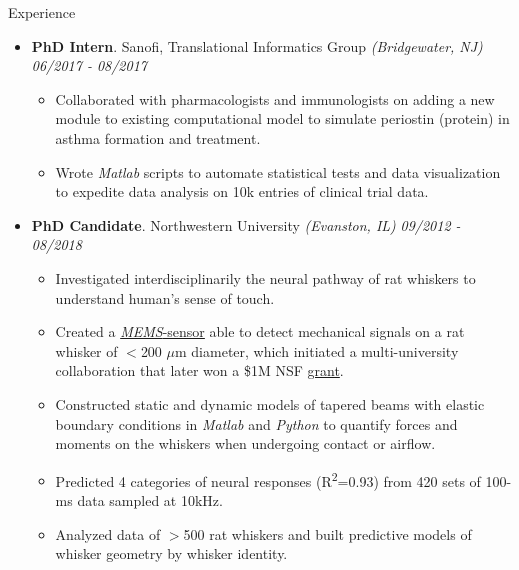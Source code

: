 \documentclass{resume} %
\begin{document}
\begin{rSection}{Experience}
\begin{itemize}[leftmargin=0em]
			\item {\bf PhD Intern}{. Sanofi, Translational Informatics Group \textit{(Bridgewater, NJ)}} \hfill {\em 06/2017 - 08/2017}\\
			\vspace{-5mm}
			\begin{itemize}
				\setlength\itemsep{-1.75em}	
				\item Collaborated with pharmacologists and immunologists on adding a new module to existing computational model to simulate periostin (protein) in asthma formation and treatment.\\
				\item Wrote \textit{Matlab} scripts to automate statistical tests and data visualization to expedite data analysis on 10k entries of clinical trial data.
			\end{itemize}
			
			\item {\bf PhD Candidate}{. Northwestern University \textit{(Evanston, IL)}} \hfill {\em 09/2012 - 08/2018}\\
			\vspace{-5mm}
			\begin{itemize}
				\setlength\itemsep{-1.75em}
				\item Investigated interdisciplinarily the neural pathway of rat whiskers to understand human's sense of touch.\\
				\item Created a \href{https://www.youtube.com/watch?v=EPuThXPd-qw}{\textit{MEMS}-sensor} able to detect mechanical signals on a rat whisker of $<$200 $\mu$m diameter, which initiated a multi-university collaboration that later won a \$1M NSF \href{https://www.nsf.gov/news/mmg/mmg_disp.jsp?med_id=132588}{grant}.\\
				\item Constructed static and dynamic models of tapered beams with elastic boundary conditions in \textit{Matlab} and \textit{Python} to quantify forces and moments on the whiskers when undergoing contact or airflow.\\
				\item Predicted 4 categories of neural responses (R\textsuperscript{2}=0.93) from 420 sets of 100-ms data sampled at 10kHz.\\
				\item Analyzed data of $>$500 rat whiskers and built predictive models of whisker geometry by whisker identity.	
			\end{itemize}
			
			
		\end{itemize}
		
	\end{rSection}
	
\end{document}
